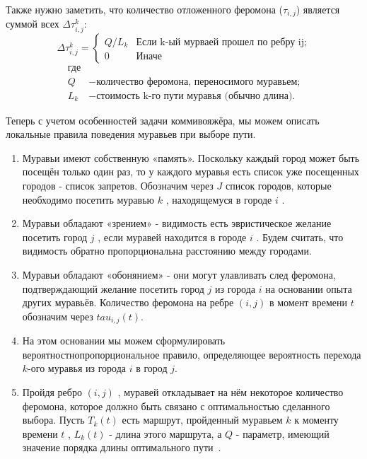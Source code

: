 \documentclass[a4paper,oneside,14pt]{extreport}
\begin{document}
\begin{enumerate}
	Также нужно заметить, что количество отложенного феромона ($\tau _{i,j}$) является суммой всех $\Delta \tau _{i,j}^k$:\\
	
	\begin{equation}\label{form:add} 
	{\displaystyle \Delta \tau _{i,j}^k={\begin{cases}Q/L_{k}& {\mbox{Если k-ый мурваей прошел по ребру ij;}}\\0&{\mbox{Иначе}}\end{cases}}}
	\end{equation}
	\begin{align*}
	\text{где} \\
	Q &- \text{количество феромона, переносимого муравьем;} \\
	L_{k} &- \text{стоимость k-го пути муравья (обычно длина).}
	\end{align*} 
	
\end{enumerate}

Теперь с учетом особенностей задачи коммивояжёра, мы можем описать локальные правила поведения муравьев при выборе пути.
\begin{enumerate}
	\item Муравьи имеют собственную «память». Поскольку каждый город может быть посещён только один раз, то у каждого муравья есть список уже посещенных городов - список запретов. Обозначим через $J$ список городов, которые необходимо посетить муравью $k$ , находящемуся в городе $i$ .
	
	\item Муравьи обладают «зрением» - видимость есть эвристическое желание посетить город $j$ , если муравей находится в городе $i$ . Будем считать, что видимость обратно пропорциональна расстоянию между городами.
	
	\item Муравьи обладают «обонянием» - они могут улавливать след феромона, подтверждающий желание посетить город $j$ из города $i$ на основании опыта других муравьёв. Количество феромона на ребре $(i,j)$ в момент времени $t$ обозначим через $tau _{i,j} (t)$.
	
	\item На этом основании мы можем сформулировать вероятностнопропорциональное правило, определяющее вероятность перехода $k$-ого муравья из города $i$ в город $j$.
	
	\item Пройдя ребро $(i,j)$ , муравей откладывает на нём некоторое количество феромона, которое должно быть связано с оптимальностью сделанного выбора. Пусть $T _{k} (t)$ есть маршрут, пройденный муравьем $k$ к моменту времени $t$ , $L _{k} (t)$ - длина этого маршрута, а $Q$ - параметр, имеющий значение порядка длины оптимального пути~\cite{3}.
\end{enumerate} 
\end{document}
